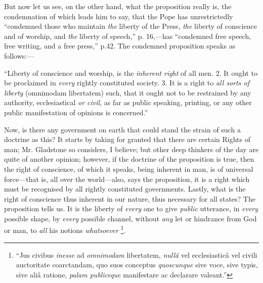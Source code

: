 But now let us see, on the other hand, what the proposition really
is, the condemnation of which leads him to say, that the Pope has
unrestrictedly ``condemned those who maintain \emph{the} liberty of
the Press, \emph{the} liberty of conscience and of worship, and \emph{the}
liberty of speech,'' p. 16,—has ``condemned free speech, free
writing, and a free press,'' p.42. The condemned proposition speaks
as follows:—

``Liberty of conscience and worship, is the \emph{inherent right}
of all men. 2. It ought to be proclaimed in \emph{every} rightly
constituted society. 3. It is a right to \emph{all sorts of liberty} (omnimodam
libertatem) such, that it ought not to be restrained by any authority,
ecclesiastical \emph{or civil}, as far as public speaking, printing, or
any other public manifestation of opinions is concerned.''

Now, is there any government on earth that could stand the strain of
such a doctrine as this? It starts by taking for granted that there are
certain Rights of man; Mr. Gladstone so considers, I believe; but other
deep thinkers of the day are quite of another opinion; however, if
the doctrine of the proposition is true, then the right of conscience,
of which it speaks, being inherent in man, is of universal force—that
is, all over the world—also, says the proposition, it is a right which
must be recognised by all rightly constituted governments. Lastly, what
is the right of conscience thus inherent in our nature, thus necessary
for all states? The proposition tells us. It is the liberty of \emph{every}
one to give \emph{public} utterance, in \emph{every} possible shape, by \emph{every}
possible channel, without \emph{any} let or hindrance from God or man,
to \emph{all} his notions \emph{whatsoever} \footnote{``Jus civibus \emph{inesse} ad \emph{omnimodam}
libertatem, \emph{nullâ} vel ecclesiasticâ vel civili auctoritate
coarctandam, quo suos conceptus \emph{quoscunque} sive voce, sive typis,
sive aliâ ratione, \emph{palam publiceque} manifestare ac declarare
valeant.''}.

